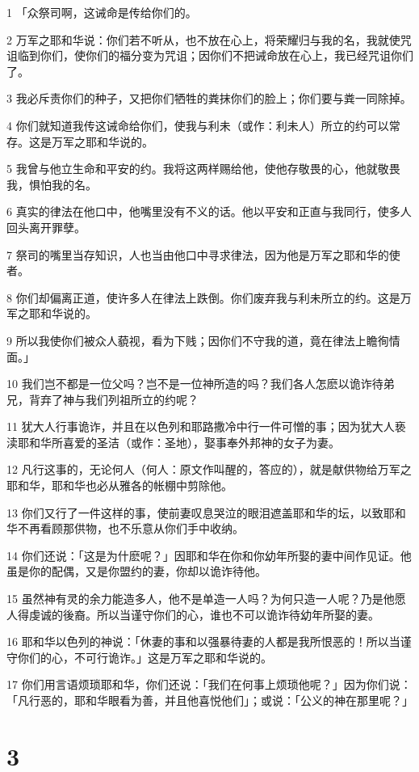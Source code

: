 \par 1 「众祭司啊，这诫命是传给你们的。
\par 2 万军之耶和华说：你们若不听从，也不放在心上，将荣耀归与我的名，我就使咒诅临到你们，使你们的福分变为咒诅；因你们不把诫命放在心上，我已经咒诅你们了。
\par 3 我必斥责你们的种子，又把你们牺牲的粪抹你们的脸上；你们要与粪一同除掉。
\par 4 你们就知道我传这诫命给你们，使我与利未（或作：利未人）所立的约可以常存。这是万军之耶和华说的。
\par 5 我曾与他立生命和平安的约。我将这两样赐给他，使他存敬畏的心，他就敬畏我，惧怕我的名。
\par 6 真实的律法在他口中，他嘴里没有不义的话。他以平安和正直与我同行，使多人回头离开罪孽。
\par 7 祭司的嘴里当存知识，人也当由他口中寻求律法，因为他是万军之耶和华的使者。
\par 8 你们却偏离正道，使许多人在律法上跌倒。你们废弃我与利未所立的约。这是万军之耶和华说的。
\par 9 所以我使你们被众人藐视，看为下贱；因你们不守我的道，竟在律法上瞻徇情面。」
\par 10 我们岂不都是一位父吗？岂不是一位神所造的吗？我们各人怎麽以诡诈待弟兄，背弃了神与我们列祖所立的约呢？
\par 11 犹大人行事诡诈，并且在以色列和耶路撒冷中行一件可憎的事；因为犹大人亵渎耶和华所喜爱的圣洁（或作：圣地），娶事奉外邦神的女子为妻。
\par 12 凡行这事的，无论何人（何人：原文作叫醒的，答应的），就是献供物给万军之耶和华，耶和华也必从雅各的帐棚中剪除他。
\par 13 你们又行了一件这样的事，使前妻叹息哭泣的眼泪遮盖耶和华的坛，以致耶和华不再看顾那供物，也不乐意从你们手中收纳。
\par 14 你们还说：「这是为什麽呢？」因耶和华在你和你幼年所娶的妻中间作见证。他虽是你的配偶，又是你盟约的妻，你却以诡诈待他。
\par 15 虽然神有灵的余力能造多人，他不是单造一人吗？为何只造一人呢？乃是他愿人得虔诚的後裔。所以当谨守你们的心，谁也不可以诡诈待幼年所娶的妻。
\par 16 耶和华以色列的神说：「休妻的事和以强暴待妻的人都是我所恨恶的！所以当谨守你们的心，不可行诡诈。」这是万军之耶和华说的。
\par 17 你们用言语烦琐耶和华，你们还说：「我们在何事上烦琐他呢？」因为你们说：「凡行恶的，耶和华眼看为善，并且他喜悦他们」；或说：「公义的神在那里呢？」

\chapter{3}

